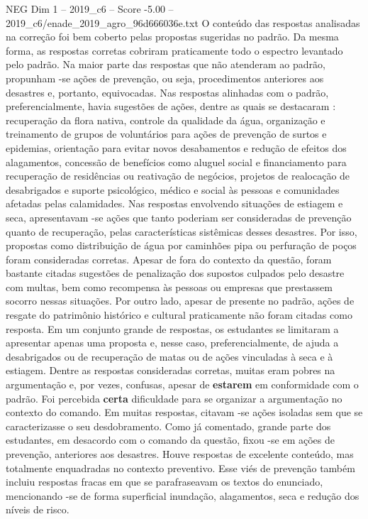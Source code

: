 \begin{textsample}{NEG Dim 1 – 2019\_c6 – Score -5.00 – 2019\_c6/enade\_2019\_agro\_96d666036e.txt}
O conteúdo das respostas analisadas na correção foi bem coberto pelas propostas sugeridas no padrão.
Da mesma forma, as respostas corretas cobriram praticamente todo o espectro levantado pelo padrão.
Na maior parte das respostas que não atenderam ao padrão, propunham -se ações de prevenção, ou seja, procedimentos anteriores aos desastres e, portanto, equivocadas.
Nas respostas alinhadas com o padrão, preferencialmente, havia sugestões de ações, dentre as quais se destacaram : recuperação da flora nativa, controle da qualidade da água, organização e treinamento de grupos de voluntários para ações de prevenção de surtos e epidemias, orientação para evitar novos desabamentos e redução de efeitos dos alagamentos, concessão de benefícios como aluguel social e financiamento para recuperação de residências ou reativação de negócios, projetos de realocação de desabrigados e suporte psicológico, médico e social às pessoas e comunidades afetadas pelas calamidades.
Nas respostas envolvendo situações de estiagem e seca, apresentavam -se ações que tanto poderiam ser consideradas de prevenção quanto de recuperação, pelas características sistêmicas desses desastres.
Por isso, propostas como distribuição de água por caminhões pipa ou perfuração de poços foram consideradas corretas.
Apesar de fora do contexto da questão, foram bastante citadas sugestões de penalização dos supostos culpados pelo desastre com multas, bem como recompensa às pessoas ou empresas que prestassem socorro nessas situações.
Por outro lado, apesar de presente no padrão, ações de resgate do patrimônio histórico e cultural praticamente não foram citadas como resposta.
Em um conjunto grande de respostas, os estudantes se limitaram a apresentar apenas uma proposta e, nesse caso, preferencialmente, de ajuda a desabrigados ou de recuperação de matas ou de ações vinculadas à seca e à estiagem.
Dentre as respostas consideradas corretas, muitas eram pobres na argumentação e, por vezes, confusas, apesar de \textbf{estarem} em conformidade com o padrão.
Foi percebida \textbf{certa} dificuldade para se organizar a argumentação no contexto do comando.
Em muitas respostas, citavam -se ações isoladas sem que se caracterizasse o seu desdobramento.
Como já comentado, grande parte dos estudantes, em desacordo com o comando da questão, fixou -se em ações de prevenção, anteriores aos desastres.
Houve respostas de excelente conteúdo, mas totalmente enquadradas no contexto preventivo.
Esse viés de prevenção também incluiu respostas fracas em que se parafraseavam os textos do enunciado, mencionando -se de forma superficial inundação, alagamentos, seca e redução dos níveis de risco.

\end{textsample}
